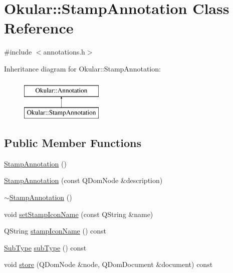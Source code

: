 \hypertarget{classOkular_1_1StampAnnotation}{\section{Okular\+:\+:Stamp\+Annotation Class Reference}
\label{classOkular_1_1StampAnnotation}
}


{\ttfamily \#include $<$annotations.\+h$>$}

Inheritance diagram for Okular\+:\+:Stamp\+Annotation\+:\begin{figure}[H]
\begin{center}
\leavevmode
\includegraphics[height=2.000000cm]{classOkular_1_1StampAnnotation}
\end{center}
\end{figure}
\subsection*{Public Member Functions}
\begin{DoxyCompactItemize}
\item 
\hyperlink{classOkular_1_1StampAnnotation_a0c693d9241c13bff0f98a34e2d2f578c}{Stamp\+Annotation} ()
\item 
\hyperlink{classOkular_1_1StampAnnotation_a959073044e142c120c771df3e32519b4}{Stamp\+Annotation} (const Q\+Dom\+Node \&description)
\item 
\hyperlink{classOkular_1_1StampAnnotation_ae3dbfccbace1e150da4c37eeea52a42b}{$\sim$\+Stamp\+Annotation} ()
\item 
void \hyperlink{classOkular_1_1StampAnnotation_a3bfe9da6d3494b762bc5561c6169179b}{set\+Stamp\+Icon\+Name} (const Q\+String \&name)
\item 
Q\+String \hyperlink{classOkular_1_1StampAnnotation_a444978f06c11e4f74fbf1653555b4170}{stamp\+Icon\+Name} () const 
\item 
\hyperlink{classOkular_1_1Annotation_af71b46e37d5f850b97d5c4de3be9aac0}{Sub\+Type} \hyperlink{classOkular_1_1StampAnnotation_ae148c417d2dab5c9c54ebc8221d18cb2}{sub\+Type} () const 
\item 
void \hyperlink{classOkular_1_1StampAnnotation_a57da3824cf0d1981136e7115f6c4b4ae}{store} (Q\+Dom\+Node \&node, Q\+Dom\+Document \&document) const 
\end{DoxyCompactItemize}
